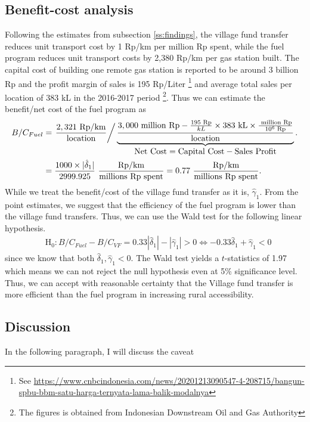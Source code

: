\documentclass[letterpaper,12pt,leqno]{article}
\newcommand{\Hy}{\text{H}}
\begin{document}
\subsection{Benefit-cost analysis}
Following the estimates from subsection \ref{ss:findings}, the village fund transfer reduces unit transport cost by 1 Rp/km per million Rp spent, while the fuel program reduces unit transport costs by 2,380 Rp/km per gas station built. The capital cost of building one remote gas station is reported to be around 3 billion Rp and the profit margin of sales is 195 Rp/Liter \footnote{See \href{https://www.cnbcindonesia.com/news/20201213090547-4-208715/bangun-spbu-bbm-satu-harga-ternyata-lama-balik-modalnya}{https://www.cnbcindonesia.com/news/20201213090547-4-208715/bangun-spbu-bbm-satu-harga-ternyata-lama-balik-modalnya}} and average total sales per location of 383 kL in the 2016-2017 period \footnote{The figures is obtained from Indonesian Downstream Oil and Gas Authority}.
Thus we can estimate the benefit/net cost of the fuel program as
\begin{align*}
   B/C_{Fuel}&=\left.\frac{2,321 \text{ Rp/km}}{\text{location}}\right/ \underbrace{\frac{3,000 \text{ million Rp}-\frac{195\text{ Rp}}{kL}\times 383\text{ kL}\times\frac{\text{ million Rp}}{10^6\text{ Rp}}}{\text{location}}}_{\displaystyle \text{Net Cost} = \text{Capital Cost} - \text{Sales Profit}}.\\
   &= \frac{1000 \times |\hat{\delta}_1|}{2999.925} \ \frac{\text{Rp/km}}{\text{millions Rp spent}}=0.77\ \frac{\text{Rp/km}}{\text{millions Rp spent}}.
\end{align*}
While we treat the benefit/cost of the village fund transfer as it is, $\hat{\gamma}_1$. From the point estimates, we suggest that the efficiency of the fuel program is lower than the village fund transfers. Thus, we can use the Wald test for the following linear hypothesis.
\begin{align*}
    &\Hy_0: B/C_{Fuel}-B/C_{VF}=0.33|\hat{\delta}_1|-|\hat{\gamma}_1|>0 \Leftrightarrow -0.33\hat{\delta}_1+\hat{\gamma}_1<0
\end{align*}
since we know that both $\hat{\delta}_1,\hat{\gamma}_1<0$. The Wald test yields a $t$-statistics of 1.97 which means we can not reject the null hypothesis even at 5\% significance level. Thus, we can accept with reasonable certainty that the Village fund transfer is more efficient than the fuel program in increasing rural accessibility.

\subsection{Discussion}
In the following paragraph, I will discuss the caveat
\end{document}

